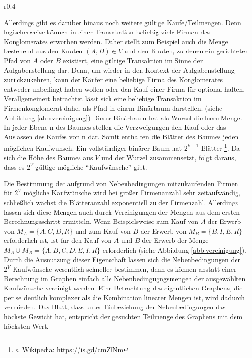 \begin{wrapfigure}{r}{0.4\textwidth}
  \begin{center}
    \sidesubfloat[]{}
    \vspace{2em}
    \sidesubfloat[]{}
  \end{center}
  \caption{Beispielgraph und binärer Baum}
  \label{abb:vereinigung}
\end{wrapfigure}
Allerdings gibt es darüber hinaus noch weitere gültige Käufe/Teilmengen. Denn logischerweise können in einer Transakation beliebig viele Firmen des Konglomerates erworben werden. Daher stellt zum Beispiel auch die Menge bestehend aus den Knoten \((A, B) \in V\) und den Knoten, zu denen ein gerichteter Pfad von \(A\) oder \(B\) existiert, eine gültige Transaktion im Sinne der Aufgabenstellung dar.
Denn, um wieder in den Kontext der Aufgabenstellung zurückzukehren, kann der Käufer eine beliebige Firma des Konglomerates entweder unbedingt haben wollen oder den Kauf einer Firma für optional halten. 
Verallgemeinert betrachtet lässt sich eine beliebige Transaktion im Firmenkonglomerat daher als Pfad in einem Binärbaum darstellen. (siehe Abbildung \ref{abb:vereinigung})
Dieser Binärbaum hat als Wurzel die leere Menge. In jeder Ebene n des Baumes stellen die Verzweigungen den Kauf oder das Auslassen des Kaufes von n dar. Somit enthalten die Blätter des Baumes jeden möglichen Kaufwunsch. Ein vollständiger binärer Baum hat \(2^{h-1}\) Blätter \footnote{s. Wikipedia: \url{https://is.gd/cmZlNm}}. Da sich die Höhe des Baumes aus \(V\) und der Wurzel zusammensetzt, folgt daraus, dass es \(2^V\) gültige mögliche "`Kaufwünsche"' gibt.

Die Bestimmung der aufgrund von Nebenbedingungen mitzukaufenden Firmen für \(2^V\) mögliche Kaufwünsche wird bei großer Firmenanzahl sehr zeitaufwändig, schließlich wächst die Blätteranzahl exponentiell zu der Firmenzahl. Allerdings lassen sich diese Mengen auch durch Vereinigungen der Mengen aus dem ersten Berechnungsschritt ermitteln.
Wenn Beispielsweise zum Kauf von \(A\) der Erwerb von \(M_A=\{A, C, D, R\}\) und zum Kauf von \(B\) der Erwerb von \(M_B = \{B, I, E, R\}\) erforderlich ist, ist für den Kauf von \(A\) und \(B\) der Erwerb der Menge \(M_A \cup M_B = \{A, B, C, D, E, I, R\}\) erforderlich (siehe Abbildung \ref{abb:vereinigung}).
Durch die Ausnutzung dieser Eigenschaft lassen sich die Nebenbedingungen der \(2^V\) Kaufwünsche wesentlich schneller bestimmen, denn es können anstatt einer Berechnung im Graphen einfach alle Nebenbedingugngsmengen der ausgewählten Kaufwünsche vereinigt werden.
Eine Betrachtung des eigentlichen Graphens, die per se deutlich komplexer als  die Kombination linearer Mengen ist, wird dadurch vermieden.
Das Blatt, dass unter Einbeziehung der Nebenbedingungen das höchste Gewicht hat, entspricht der gesuchten Teilmenge des Graphens mit dem höchsten Wert.

